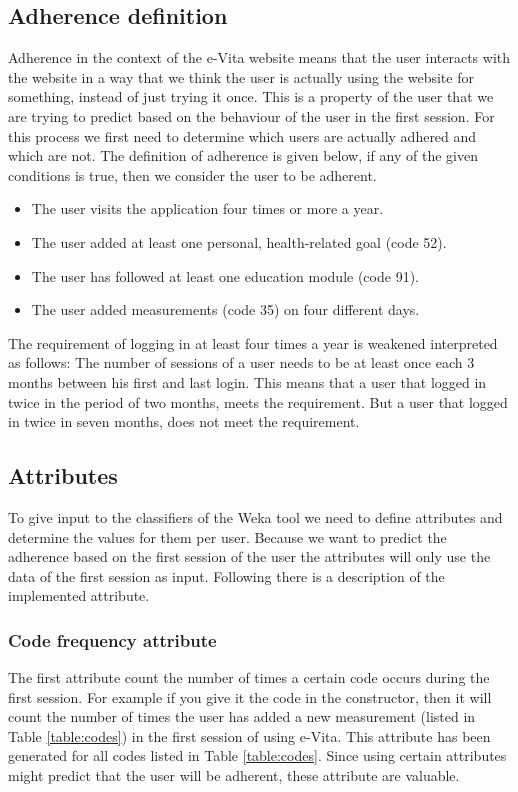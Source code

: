 \subsection{Adherence definition}
Adherence in the context of the e-Vita website means that the user interacts with the website in a way that we think the user is actually using the website for something, instead of just trying it once. This is a property of the user that we are trying to predict based on the behaviour of the user in the first session. For this process we first need to determine which users are actually adhered and which are not. The definition of adherence is given below, if any of the given conditions is true, then we consider the user to be adherent.

\begin{itemize}
	\item The user visits the application four times or more a year.
	\item The user added at least one personal, health-related goal (code 52).
	\item The user has followed at least one education module (code 91).
	\item The user added measurements (code 35) on four different days.
\end{itemize}

The requirement of logging in at least four times a year is weakened interpreted as follows: The number of sessions of a user needs to be at least once each 3 months between his first and last login. This means that a user that logged in twice in the period of two months, meets the requirement. But a user that logged in twice in seven months, does not meet the requirement. 

\subsection{Attributes} \label{subsection:attributes}
To give input to the classifiers of the Weka tool we need to define attributes and determine the values for them per user. Because we want to predict the adherence based on the first session of the user the attributes will only use the data of the first session as input. Following there is a description of the implemented attribute.

\subsubsection{Code frequency attribute}
The first attribute count the number of times a certain code occurs during the first session. For example if you give it the code  in the constructor, then it will count the number of times the user has added a new measurement (listed in Table \ref{table:codes}) in the first session of using e-Vita. This attribute has been generated for all codes listed in Table \ref{table:codes}. Since using certain attributes might predict that the user will be adherent, these attribute are valuable.

